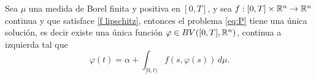 \newpage
\begin{thm}\label{th:picar}
    Sea $\mu$ una medida de Borel finita y positiva en $[0,T]$, y sea $f:[0,T]\times\mathbb{R}^n\to\mathbb{R}^n$ continua y que satisface \ref{f lipschitz}, entonces el problema \eqref{eq:P} tiene una única solución, es decir existe una única función $\varphi\in BV([0,T],\mathbb{R}^n)$, continua a izquierda tal que 
    \begin{equation*}
        \varphi(t)=\alpha + \int_{[0,t)}f(s,\varphi(s))\, d\mu.
    \end{equation*}
\end{thm}
